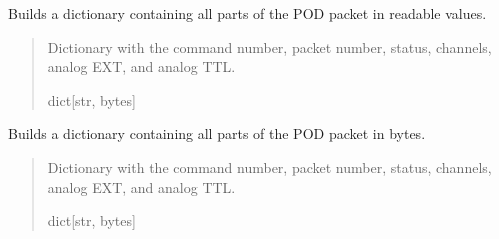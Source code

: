 \documentclass[letterpaper,10pt,english]{sphinxmanual}
\begin{document}
\begin{fulllineitems}
\begin{fulllineitems}
\end{fulllineitems}


\begin{fulllineitems}
\label{\detokenize{Morelia.Packets:Morelia.Packets.Binary5.PacketBinary5.TranslateAll}}
\pysigstartsignatures
{}
\pysigstopsignatures
\sphinxAtStartPar
Builds a dictionary containing all parts of the POD packet in readable values.
\begin{quote}\begin{description}
\sphinxAtStartPar
Dictionary with the command number, packet number, status,                 channels, analog EXT, and analog TTL.

\sphinxAtStartPar
dict{[}str, bytes{]}

\end{description}\end{quote}

\end{fulllineitems}


\begin{fulllineitems}
\label{\detokenize{Morelia.Packets:Morelia.Packets.Binary5.PacketBinary5.UnpackAll}}
\pysigstartsignatures
{}
\pysigstopsignatures
\sphinxAtStartPar
Builds a dictionary containing all parts of the POD packet in bytes.
\begin{quote}\begin{description}
\sphinxAtStartPar
Dictionary with the command number, packet number, status,                 channels, analog EXT, and analog TTL.

\sphinxAtStartPar
dict{[}str, bytes{]}

\end{description}\end{quote}


\end{fulllineitems}
\end{fulllineitems}
\end{document}
